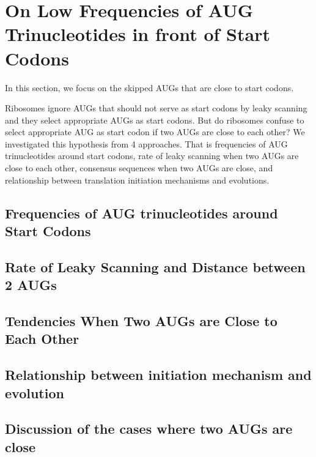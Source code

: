 
\topmargin=-45pt
\oddsidemargin=0cm
\evensidemargin=0cm
\textheight=23.7cm
\textwidth=16cm



\setcounter{section}{9}
\setcounter{page}{18}
\section{On Low Frequencies of AUG Trinucleotides in front of Start Codons}
In this section, we focus on the skipped AUGs that are close to start
codons.

Ribosomes ignore AUGs that should not serve as start codons by leaky 
scanning and they select appropriate AUGs as start codons. But do
ribosomes confuse to select appropriate AUG as start codon if two AUGs
are close to each other? We investigated this hypothesis from
4 approaches. That is frequencies of AUG trinucleotides around start codons,
rate of leaky scanning when two AUGs are close to each other,
consensus sequences when two AUGs are close, and relationship between
translation initiation mechanisms and evolutions.


\subsection{Frequencies of AUG trinucleotides around Start Codons}
 


\subsection{Rate of Leaky Scanning and Distance between 2 AUGs}



\subsection{Tendencies When Two AUGs are Close to Each Other}




\subsection{Relationship between initiation mechanism and evolution}



\subsection{Discussion of the cases where two AUGs are close}


